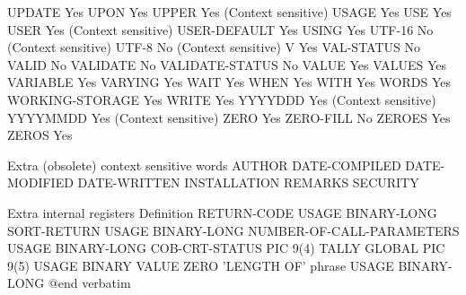 UPDATE                          Yes
UPON                            Yes
UPPER                           Yes (Context sensitive)
USAGE                           Yes
USE                             Yes
USER                            Yes (Context sensitive)
USER-DEFAULT                    Yes
USING                           Yes
UTF-16                          No (Context sensitive)
UTF-8                           No (Context sensitive)
V                               Yes
VAL-STATUS                      No
VALID                           No
VALIDATE                        No
VALIDATE-STATUS                 No
VALUE                           Yes
VALUES                          Yes
VARIABLE                        Yes
VARYING                         Yes
WAIT                            Yes
WHEN                            Yes
WITH                            Yes
WORDS                           Yes
WORKING-STORAGE                 Yes
WRITE                           Yes
YYYYDDD                         Yes (Context sensitive)
YYYYMMDD                        Yes (Context sensitive)
ZERO                            Yes
ZERO-FILL                       No
ZEROES                          Yes
ZEROS                           Yes

Extra (obsolete) context sensitive words
AUTHOR
DATE-COMPILED
DATE-MODIFIED
DATE-WRITTEN
INSTALLATION
REMARKS
SECURITY

Extra internal registers        Definition
RETURN-CODE                     USAGE BINARY-LONG
SORT-RETURN                     USAGE BINARY-LONG
NUMBER-OF-CALL-PARAMETERS       USAGE BINARY-LONG
COB-CRT-STATUS                  PIC 9(4)
TALLY                           GLOBAL PIC 9(5) USAGE BINARY VALUE ZERO
'LENGTH OF' phrase              USAGE BINARY-LONG
@end verbatim


